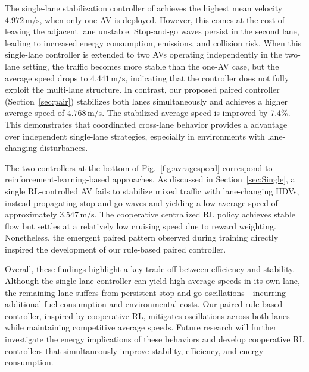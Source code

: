 \documentclass{ifacconf}
\newcommand{\1}{\mbox{1}\hspace{-0.25em}\mbox{l}}
\begin{document}
The single-lane stabilization controller of \citet{wu2018stabilizing} achieves the highest mean velocity $4.972\,\text{m/s}$, when only one AV is deployed. However, this comes at the cost of leaving the adjacent lane unstable. Stop-and-go waves persist in the second lane, leading to increased energy consumption, emissions, and collision risk. When this single-lane controller is extended to two AVs operating independently in the two-lane setting, the traffic becomes more stable than the one-AV case, but the average speed drops to $4.441\,\text{m/s}$, indicating that the controller does not fully exploit the multi-lane structure. In contrast, our proposed paired controller (Section~\ref{sec:pair}) stabilizes both lanes simultaneously and achieves a higher average speed of $4.768\,\text{m/s}$. The stabilized average speed is improved by 7.4\%. This demonstrates that coordinated cross-lane behavior provides a advantage over independent single-lane strategies, especially in environments with lane-changing disturbances. 

The two controllers at the bottom of Fig.~\ref{fig:avragespeed} correspond to reinforcement-learning-based approaches. As discussed in Section~\ref{sec:Single}, a single RL-controlled AV fails to stabilize mixed traffic with lane-changing HDVs, instead propagating stop-and-go waves and yielding a low average speed of approximately $3.547\,\text{m/s}$. The cooperative centralized RL policy achieves stable flow but settles at a relatively low cruising speed due to reward weighting. Nonetheless, the emergent paired pattern observed during training directly inspired the development of our rule-based paired controller.

Overall, these findings highlight a key trade-off between efficiency and stability. Although the single-lane controller can yield high average speeds in its own lane, the remaining lane suffers from persistent stop-and-go oscillations—incurring additional fuel consumption and environmental costs. Our paired rule-based controller, inspired by cooperative RL, mitigates oscillations across both lanes while maintaining competitive average speeds. Future research will further investigate the energy implications of these behaviors and develop cooperative RL controllers that simultaneously improve stability, efficiency, and energy consumption.
\end{document}
